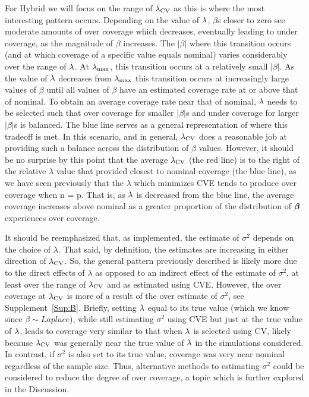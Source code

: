 For Hybrid we will focus on the range of $\lambda_{\textrm{CV}}$ as this is where the most interesting pattern occurs. Depending on the value of $\lambda$, $\beta$s closer to zero see moderate amounts of over coverage which decreases, eventually leading to under coverage, as the magnitude of $\beta$ increases. The $|\beta|$ where this transition occurs (and at which coverage of a specific value equals nominal) varies considerably over the range of $\lambda$. At $\lambda_{\max}$, this transition occurs at a relatively small $|\beta|$. As the value of $\lambda$ decreases from $\lambda_{\max}$ this transition occurs at increasingly large values of $\beta$ until all values of $\beta$ have an estimated coverage rate at or above that of nominal. To obtain an average coverage rate near that of nominal, $\lambda$ needs to be selected such that over coverage for smaller $|\beta|$s and under coverage for larger $|\beta|$s is balanced. The blue line serves as a general representation of where this tradeoff is met. In this scenario, and in general, $\lambda_{\textrm{CV}}$ does a reasonable job at providing such a balance across the distribution of $\beta$ values. However, it should be no surprise by this point that the average $\lambda_{\textrm{CV}}$ (the red line) is to the right of the relative $\lambda$ value that provided closest to nominal coverage (the blue line), as we have seen previously that the $\lambda$ which minimizes CVE tends to produce over coverage when n = p. That is, as $\lambda$ is decreased from the blue line, the average coverage increases above nominal as a greater proportion of the distribution of $\boldsymbol{\beta}$ experiences over coverage.

It should be reemphasized that, as implemented, the estimate of $\sigma^2$ depends on the choice of $\lambda$. That said, by definition, the estimates are increasing in either direction of $\lambda_{\textrm{CV}}$. So, the general pattern previously described is likely more due to the direct effects of $\lambda$ as opposed to an indirect effect of the estimate of $\sigma^2$, at least over the range of $\lambda_{\textrm{CV}}$ and as estimated using CVE. However, the over coverage at $\lambda_{\textrm{CV}}$ is more of a result of the over estimate of $\sigma^2$, see Supplement~\ref{Sup:B}. Briefly, setting $\lambda$ equal to its true value (which we know since $\beta \sim Laplace$), while still estimating $\sigma^2$ using CVE but just at the true value of $\lambda$, leads to coverage very similar to that when $\lambda$ is selected using CV, likely because $\lambda_{\textrm{CV}}$ was generally near the true value of $\lambda$ in the simulations considered. In contrast, if $\sigma^2$ is also set to its true value, coverage was very near nominal regardless of the sample size. Thus, alternative methods to estimating $\sigma^2$ could be considered to reduce the degree of over coverage, a topic which is further explored in the Discussion.


